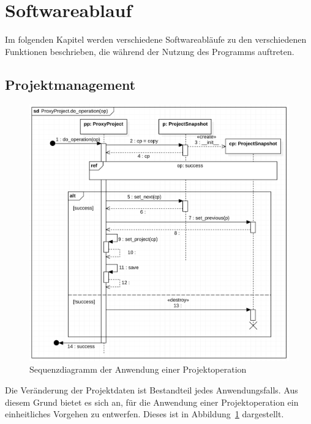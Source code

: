 \documentclass{article}
\begin{document}
\newpage
\section{Softwareablauf}

Im folgenden Kapitel werden verschiedene Softwareabläufe zu den verschiedenen Funktionen beschrieben, die während der Nutzung des Programms auftreten.

\subsection{Projektmanagement}
\begin{figure}[H]%
    \centering
    \includegraphics[width=13cm]{docs/entwurf/Entwurf_dokument/img/Michael/sd_ProxyProject.do_operation.png}
    \caption{Sequenzdiagramm der Anwendung einer Projektoperation}
    \label{fig:sd:do_operation}
\end{figure}

Die Veränderung der Projektdaten ist Bestandteil jedes Anwendungsfalls. Aus diesem Grund bietet es sich an, für die Anwendung einer Projektoperation ein einheitliches Vorgehen zu entwerfen. Dieses ist in Abbildung~\ref{fig:sd:do_operation} dargestellt.\\
\end{document}
